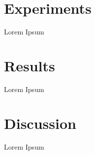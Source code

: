 \documentclass[a4paper,12pt]{report}
\begin{document}
\section{Experiments} \label{s:expr}
Lorem Ipsum %

\section{Results} \label{s:resul}
Lorem Ipsum %

\section{Discussion} \label{s:disc}
Lorem Ipsum %

\pagebreak



\end{document}
